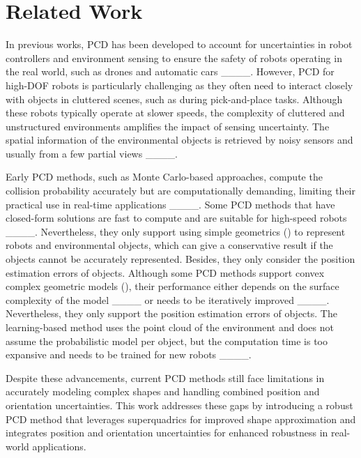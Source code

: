 \section{Related Work}
In previous works, PCD has been developed to account for uncertainties in robot controllers and environment sensing to ensure the safety of robots operating in the real world, such as drones and automatic cars ____. However, PCD for high-DOF robots is particularly challenging as they often need to interact closely with objects in cluttered scenes, such as during pick-and-place tasks. Although these robots typically operate at slower speeds, the complexity of cluttered and unstructured environments amplifies the impact of sensing uncertainty. The spatial information of the environmental objects is retrieved by noisy sensors and usually from a few partial views ____. 

Early PCD methods, such as Monte Carlo-based approaches, compute the collision probability accurately but are computationally demanding, limiting their practical use in real-time applications ____. Some PCD methods that have closed-form solutions are fast to compute and are suitable for high-speed robots ____. Nevertheless, they only support using simple geometrics () to represent robots and environmental objects, which can give a conservative result if the objects cannot be accurately represented. Besides, they only consider the position estimation errors of objects. Although some PCD methods support convex complex geometric models (), their performance either depends on the surface complexity of the model ____ or needs to be iteratively improved ____. Nevertheless, they only support the position estimation errors of objects. The learning-based method uses the point cloud of the environment and does not assume the probabilistic model per object, but the computation time is too expansive and needs to be trained for new robots ____. 

Despite these advancements, current PCD methods still face limitations in accurately modeling complex shapes and handling combined position and orientation uncertainties. This work addresses these gaps by introducing a robust PCD method that leverages superquadrics for improved shape approximation and integrates position and orientation uncertainties for enhanced robustness in real-world applications.